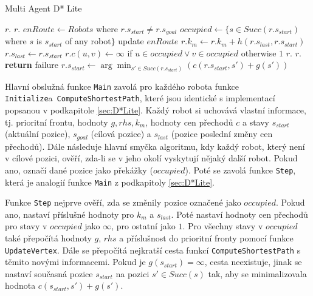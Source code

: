 \begin{algorithm}[H]
	\caption{Multi Agent D* Lite}
	\label{alg:LRD*Lite}
	\begin{algorithmic}[1]
			\State $r.$
			\State $r.$
		\EndFor
		\State $enRoute\gets Robots$ where $r.s_{start}\neq r.s_{goal}$
				\State $occupied\gets \{s\in Succ(r.s_{start})$ where $s$ is $s_{start}$ of any robot$\}$
				\State {}
				\State update $enRoute$
			\EndFor
		\EndWhile
		\EndFunction
		\Statex
				\State $r.k_m\gets r.k_m+h(r.s_{last},r.s_{start})$
				\State $r.s_{last}\gets r.s_{start}$
				\State $r.c(u,v)\gets \infty$ if $u\in occupied\vee v\in occupied$ otherwise $1$
					\State $r.$
				\EndFor
				\State $r.$
			\EndIf
			\State \textbf{return} failure
			\EndIf
			\State $r.s_{start}\gets \arg\min_{s'\in Succ(r.s_{start})}(c(r.s_{start},s')+g(s'))$
		\EndFunction
	\end{algorithmic}
\end{algorithm}

Hlavní obslužná funkce \texttt{Main} zavolá pro každého robota funkce \texttt{Initialize}\linebreak a~\texttt{ComputeShortestPath}, které jsou identické s implementací popsanou v podkapitole \ref{sec:D*Lite}. Každý robot si uchovává vlastní informace, tj. prioritní frontu, hodnoty $g,rhs,k_m$, hodnoty cen přechodů $c$ a stavy $s_{start}$ (aktuální pozice), $s_{goal}$ (cílová pozice) a $s_{last}$ (pozice poslední změny cen přechodů). Dále následuje hlavní smyčka algoritmu, kdy každý robot, který není v cílové pozici, ověří, zda-li se v jeho okolí vyskytují nějaký další robot. Pokud ano, označí dané pozice jako překážky ($occupied$). Poté se zavolá funkce \texttt{Step}, která je analogií funkce \texttt{Main} z podkapitoly \ref{sec:D*Lite}. 

Funkce \texttt{Step} nejprve ověří, zda se změnily pozice označené jako $occupied$. Pokud ano, nastaví příslušné hodnoty pro $k_m$ a $s_{last}$. Poté nastaví hodnoty cen přechodů pro stavy v $occupied$ jako $\infty$, pro ostatní jako $1$. Pro všechny stavy v $occupied$ také přepočítá hodnoty $g$, $rhs$ a příslušnost do prioritní fronty pomocí funkce \texttt{UpdateVertex}. Dále se přepočítá nejkratší cesta funkcí \texttt{ComputeShortestPath} s těmito novými informacemi. Pokud je $g(s_{start})=\infty$, cesta neexistuje, jinak se nastaví současná pozice $s_{start}$ na pozici $s'\in Succ(s)$ tak, aby se minimalizovala hodnota $c(s_{start},s')+g(s')$.

